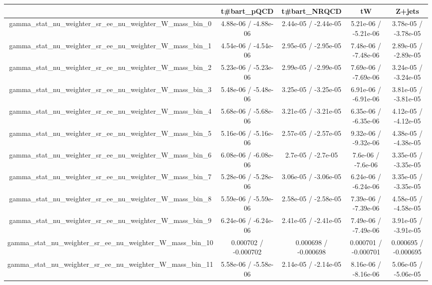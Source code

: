 \documentclass[10pt]{article}
\begin{document}
\begin{table}[htbp]
\begin{center}
\begin{tabular}{|c|c|c|c|c|}
\hline 
      & t#bar{t}_{pQCD}      & t#bar{t}_{NRQCD}      & tW      & Z+jets \\ 
\hline 
  gamma_stat_nu_weighter_sr_ee_nu_weighter_W_mass_bin_0 & 4.88e-06 / -4.88e-06 & 2.44e-05 / -2.44e-05 & 5.21e-06 / -5.21e-06 & 3.78e-05 / -3.78e-05 \\ 
  gamma_stat_nu_weighter_sr_ee_nu_weighter_W_mass_bin_1 & 4.54e-06 / -4.54e-06 & 2.95e-05 / -2.95e-05 & 7.48e-06 / -7.48e-06 & 2.89e-05 / -2.89e-05 \\ 
  gamma_stat_nu_weighter_sr_ee_nu_weighter_W_mass_bin_2 & 5.23e-06 / -5.23e-06 & 2.99e-05 / -2.99e-05 & 7.69e-06 / -7.69e-06 & 3.24e-05 / -3.24e-05 \\ 
  gamma_stat_nu_weighter_sr_ee_nu_weighter_W_mass_bin_3 & 5.48e-06 / -5.48e-06 & 3.25e-05 / -3.25e-05 & 6.91e-06 / -6.91e-06 & 3.81e-05 / -3.81e-05 \\ 
  gamma_stat_nu_weighter_sr_ee_nu_weighter_W_mass_bin_4 & 5.68e-06 / -5.68e-06 & 3.21e-05 / -3.21e-05 & 6.35e-06 / -6.35e-06 & 4.12e-05 / -4.12e-05 \\ 
  gamma_stat_nu_weighter_sr_ee_nu_weighter_W_mass_bin_5 & 5.16e-06 / -5.16e-06 & 2.57e-05 / -2.57e-05 & 9.32e-06 / -9.32e-06 & 4.38e-05 / -4.38e-05 \\ 
  gamma_stat_nu_weighter_sr_ee_nu_weighter_W_mass_bin_6 & 6.08e-06 / -6.08e-06 & 2.7e-05 / -2.7e-05 & 7.6e-06 / -7.6e-06 & 3.35e-05 / -3.35e-05 \\ 
  gamma_stat_nu_weighter_sr_ee_nu_weighter_W_mass_bin_7 & 5.28e-06 / -5.28e-06 & 3.06e-05 / -3.06e-05 & 6.24e-06 / -6.24e-06 & 3.35e-05 / -3.35e-05 \\ 
  gamma_stat_nu_weighter_sr_ee_nu_weighter_W_mass_bin_8 & 5.59e-06 / -5.59e-06 & 2.58e-05 / -2.58e-05 & 7.39e-06 / -7.39e-06 & 4.58e-05 / -4.58e-05 \\ 
  gamma_stat_nu_weighter_sr_ee_nu_weighter_W_mass_bin_9 & 6.24e-06 / -6.24e-06 & 2.41e-05 / -2.41e-05 & 7.49e-06 / -7.49e-06 & 3.91e-05 / -3.91e-05 \\ 
  gamma_stat_nu_weighter_sr_ee_nu_weighter_W_mass_bin_10 & 0.000702 / -0.000702 & 0.000698 / -0.000698 & 0.000701 / -0.000701 & 0.000695 / -0.000695 \\ 
  gamma_stat_nu_weighter_sr_ee_nu_weighter_W_mass_bin_11 & 5.58e-06 / -5.58e-06 & 2.14e-05 / -2.14e-05 & 8.16e-06 / -8.16e-06 & 5.06e-05 / -5.06e-05 \\ 

\end{tabular}
\end{center}
\end{table}
\end{document}
